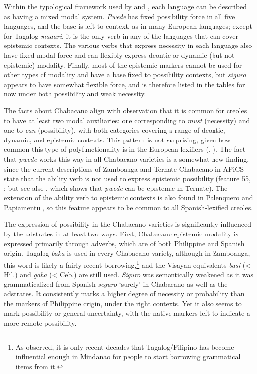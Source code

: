 \documentclass[output=paper,colorlinks,citecolor=brown]{langscibook}
\begin{document}
Within the typological framework used by \citet{MatthewsonDavis2005} and \citet{VanderKlok2013}, each language can be described as having a mixed modal system. \textit{Pwede} has fixed possibility force in all five languages, and the base is left to context, as in many European languages; except for Tagalog \textit{maaari}, it is the only verb in any of the languages that can cover epistemic contexts. The various verbs that express necessity in each language also have fixed modal force and can flexibly express deontic or dynamic (but not epistemic) modality. Finally, most of the epistemic markers cannot be used for other types of modality and have a base fixed to possibility contexts, but \textit{siguro} appears to have somewhat flexible force, and is therefore listed in the tables for now under both possibility and weak necessity. 

The facts about Chabacano align with  observation that it is common for creoles to have at least two modal auxiliaries: one corresponding to \textit{must} (necessity) and one to \textit{can} (possibility), with both categories covering a range of deontic, dynamic, and epistemic contexts. This pattern is not surprising, given how common this type of polyfunctionality is in the European lexifiers (\citealt{vanderAuweraKindt2005}, \citealt{MatthewsonDavis2005}). The fact that \textit{pwede} works this way in all Chabacano varieties is a somewhat new finding, since the current descriptions of Zamboanga and Ternate Chabacano in APiCS state that the ability verb is not used to express epistemic possibility (feature 55, \citealt{MaurerConsortium2013}; but see also \citealt{Sippola2011}, which shows that \textit{pwede} can be epistemic in Ternate). The extension of the ability verb to epistemic contexts is also found in Palenquero and Papiamentu \citep{MaurerConsortium2013}, so this feature appears to be common to all Spanish-lexified creoles. 

The expression of possibility in the Chabacano varieties is significantly influenced by the adstrates in at least two ways. First, Chabacano epistemic modality is expressed primarily through adverbs, which are of both Philippine and Spanish origin. Tagalog \textit{baka} is used in every Chabacano variety, although in Zamboanga, this word is likely a fairly recent borrowing,\footnote{As \citet[461]{Lipski2013} observed, it is only recent decades that Tagalog/Filipino has become influential enough in Mindanao for people to start borrowing grammatical items from it.} and the Visayan equivalents \textit{basi} (< Hil.) and \textit{gaha} (< Ceb.) are still used. \textit{Siguro} was semantically weakened as it was grammaticalized from Spanish \textit{seguro} {}‘surely' in Chabacano as well as the adstrates. It consistently marks a higher degree of necessity or probability than the markers of Philippine origin, under the right contexts. Yet it also seems to mark possibility or general uncertainty, with the native markers left to indicate a more remote possibility. 
\end{document}
